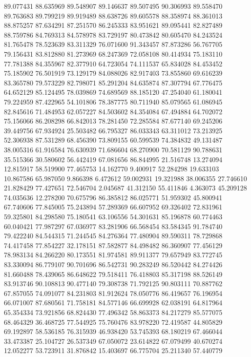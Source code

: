 89.077431
88.635969
89.548907
89.146637
89.507495
90.306993
89.558470
89.763683
89.799219
89.919489
88.638726
89.605578
88.358974
88.361013
88.875257
87.634291
87.251570
86.245333
83.951621
89.095441
82.827489
88.759786
84.769313
84.578978
83.729197
80.473842
80.605470
84.243524
81.765478
78.523639
83.311329
76.071600
91.343457
87.873286
56.767705
79.156431
83.812880
81.273969
68.247369
72.058108
80.414934
75.183110
77.781388
84.355967
82.377910
64.723054
74.111537
65.834028
84.453452
75.185902
76.501919
73.129179
84.088026
82.917403
73.855860
69.616239
83.365780
79.573229
82.798071
85.291204
84.635874
87.307794
67.776475
64.652129
85.124495
78.039869
74.689569
88.185120
47.254040
61.180041
79.224959
87.422965
54.101806
78.387775
80.711940
85.079565
61.086945
82.845616
71.484953
62.057227
84.503602
84.354084
67.494884
64.702072
75.156066
86.208298
66.842013
78.281450
72.285584
87.677140
69.245206
39.449756
67.934924
25.503482
66.795327
86.033343
63.311012
73.213925
52.306938
87.531289
68.456390
73.809155
60.599539
74.384832
49.131487
38.005316
61.916584
76.630939
71.686604
68.270900
70.581129
90.788631
35.515366
30.580602
56.442419
67.081656
86.844995
21.516748
13.274094
12.815917
58.519900
77.465753
14.162770
9.400917
52.284298
19.633103
10.867586
65.987050
9.866398
6.472612
59.002931
19.321988
38.006355
27.746610
21.828429
77.427651
72.546704
2.045687
41.312150
55.411846
4.363073
45.209128
74.035636
12.278200
70.675796
86.385812
86.025771
51.959302
45.800941
67.740606
77.845005
75.243894
57.289369
66.607952
69.326402
72.831961
59.325801
84.298580
75.180541
63.106556
54.301631
85.196878
60.774463
60.040421
77.987297
67.036977
83.281906
66.568454
83.584345
91.784740
79.422240
84.544315
71.244545
84.276364
77.480904
89.590311
78.729868
74.417458
77.854227
32.178151
87.582877
84.498482
86.360907
77.456129
78.983134
84.266220
80.173551
81.974581
89.911377
79.657949
83.772745
83.330094
86.779107
90.701696
86.542731
90.283249
86.520442
84.274426
81.660488
78.439065
86.648622
79.518411
76.418803
85.317198
88.526149
83.913746
90.108813
90.477140
79.308738
71.792125
90.803111
70.887762
67.857055
74.091077
84.231803
81.912624
78.050776
86.419657
76.196954
66.071007
87.680561
71.758181
84.577146
66.699928
62.038191
64.817964
65.354334
73.921856
68.824430
77.496342
58.863373
84.217279
85.577075
68.464329
36.468725
77.544925
75.760476
83.978220
72.419587
44.805829
69.192897
58.536185
76.315939
46.938420
53.745393
68.180219
67.466044
33.473387
25.104727
26.537349
67.050072
23.614822
67.079499
40.670274
12.052277
53.723911
31.876842
15.403697
66.775704
25.211340
57.440779
